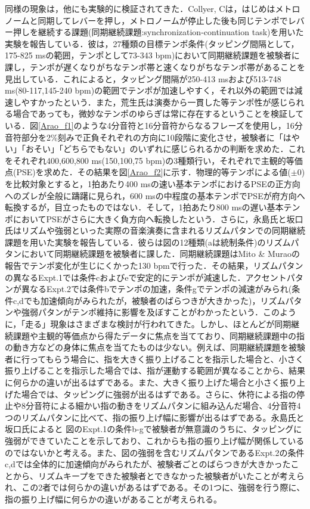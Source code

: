 \documentclass[twocolumn,10pt]{jarticle}
\begin{document}
同様の現象は，他にも実験的に検証されてきた．Collyer, C\cite{Collyer}は，はじめはメトロノームと同期してレバーを押し，メトロノームが停止した後も同じテンポでレバー押しを継続する課題(同期継続課題:synchronization-continuation task)を用いた実験を報告している．彼は，27種類の目標テンポ条件(タッピング間隔として，175-825 msの範囲，テンポとして73-343 bpm)において同期継続課題を被験者に課し，テンポが遅くなりがちなテンポ帯と速くなりがちなテンポ帯があることを見出している．これによると，タッピング間隔が250-413 msおよび513-748 ms(80-117,145-240 bpm)の範囲でテンポが加速しやすく，それ以外の範囲では減速しやすかったという．また，荒生氏\cite{Arao}は演奏から一貫した等テンポ性が感じられる場合であっても，微妙なテンポのゆらぎは常に存在するということを検証している．図\ref{Arao_f1}のような4分音符と16分音符からなるフレーズを使用し，16分音符部分を2\%刻みで正負それぞれの方向に10段階に変化させ，被験者に「はやい」「おそい」「どちらでもない」のいずれに感じられるかの判断を求めた．これをそれぞれ400,600,800 ms(150,100,75 bpm)の3種類行い，それぞれで主観的等価点(PSE)を求めた．その結果を図\ref{Arao_f2}に示す．物理的等テンポによる値($\pm 0$)を比較対象とすると，1拍あたり400 msの速い基本テンポにおけるPSEの正方向へのズレが全般に躊躇に見られ，600 msの中程度の基本テンポでPSEが府方向へ転換するが，目立ったものではない．そして，1拍あたり800 msの遅い基本テンポにおいてPSEがさらに大きく負方向へ転換したという．さらに，永島氏と坂口氏\cite{Nagasima}はリズムや強弱といった実際の音楽演奏に含まれるリズムパタンでの同期継続課題を用いた実験を報告している．彼らは図\label{Nagasima}の12種類(aは統制条件)のリズムパタンにおいて同期継続課題を被験者に課した．同期継続課題はMito \& Murao\cite{Mito}の報告でテンポ変化が生じにくかった130 bpmで行った．その結果，リズムパタンの異なるExpt.1では条件cおよびeで安定的にテンポが減速した．アクセントパタンが異なるExpt.2では条件bでテンポの加速，条件gでテンポの減速がみられ(条件c,dでも加速傾向がみられたが，被験者のばらつきが大きかった)，リズムパタンや強弱パタンがテンポ維持に影響を及ぼすことがわかったという．このように，「走る」現象はさまざまな検討が行われてきた。しかし、ほとんどが同期継続課題や主観的等価点から得たデータに焦点を当てており、同期継続課題中の指の動き方などの身体に焦点を当てたものは少ない。例えば、同期継続課題を被験者に行ってもらう場合に、指を大きく振り上げることを指示した場合と、小さく振り上げることを指示した場合では、指が運動する範囲が異なることから、結果に何らかの違いが出るはずである。また、大きく振り上げた場合と小さく振り上げた場合では、タッピングに強弱が出るはずである。さらに、休符による指の停止や8分音符による細かい指の動きをリズムパタンに組み込んだ場合、4分音符4つのリズムパタンに比べて、指の振り上げ幅に影響が出るはずである。永島氏と坂口氏\cite{Nagasima}によると
図\label{Nagasima}のExpt.1の条件b-gで被験者が無意識のうちに、タッピングに強弱ができていたことを示しており、これからも指の振り上げ幅が関係しているのではないかと考える。また、図\label{Nagasima}の強弱を含むリズムパタンであるExpt.2の条件c,dでは全体的に加速傾向がみられたが、被験者ごとのばらつきが大きかったことから、リズムキープをできた被験者とできなかった被験者がいたことが考えられ、この2者では何らかの違いがあるはずである。その1つに、強弱を行う際に、指の振り上げ幅に何らかの違いがあることが考えられる。
\end{document}
